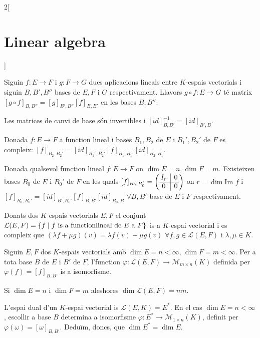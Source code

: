 \documentclass[../../../main.tex]{subfiles}
\begin{document}
\begin{multicols}{2}[\section{Linear algebra}]
\begin{prop}
Siguin $f:E\rightarrow F$ i $g:F\rightarrow G$ dues aplicacions lineals entre $K$-espais vectorials i siguin $B,B',B''$ bases de $E,F$ i $G$ respectivament. Llavors $g\circ f:E\rightarrow G$ té matrix $[g\circ f]_{B,B''}=[g]_{B',B''}[f]_{B,B'}$ en les bases $B, B''$.
\end{prop}
\begin{corollary}
Les matrices de canvi de base són invertibles i $[id]_{B,B'}^{-1}=[id]_{B',B}$.
\end{corollary}
\begin{prop}
Donada $f:E\rightarrow F$ a function lineal i bases $B_1,B_2$ de $E$ i $B_1',B_2'$ de $F$ es compleix: $[f]_{B_2,B_2'}=[id]_{B_1',B_2'}[f]_{B_1,B_1'}[id]_{B_2,B_1}$.
\end{prop}
\begin{theorem}
Donada qualsevol function lineal $f:E\rightarrow F$ on $\dim E=n, \dim F=m$. Existeixen bases $B_0$ de $E$ i $B_0'$ de $F$ en les quals $[f]_{B_0,B_0'}=\left(\begin{array}{@{\,} c|c @{\,}}
    I_r & 0\\
    \hline
    0 & 0
    \end{array}\right)$ on $r=\dim\text{Im }f$ i $[f]_{B_0,B_0'}=[id]_{B',B_0'}[f]_{B,B'}[id]_{B_0,B}$ $\forall B,B'$ base de $E$ i $F$ respectivament.
\end{theorem}
\begin{lemma}
Donats dos $K$ espais vectorials $E,F$ el conjunt $\mathcal{L}(E,F)=\{f\mid f\text{ is a function}\\ \text{lineal de $E$ a $F$}\}$ is a $K$-espai vectorial i es compleix que $(\lambda f+\mu g)(v)=\lambda f(v)+\mu g(v)$ $\forall f,g\in\mathcal{L}(E,F)$ i $\lambda,\mu\in K$.
\end{lemma}
\begin{prop}
Siguin $E,F$ dos $K$-espais vectorials amb $\dim E=n<\infty$, $\dim F=m<\infty$. Per a tota base $B$ de $E$ i $B'$ de $F$, l'function $\varphi:\mathcal{L}(E,F)\rightarrow\mathcal{M}_{m\times n}(K)$ definida per $\varphi(f)=[f]_{B,B'}$ is a isomorfisme.
\end{prop}
\begin{corollary}
Si $\dim E=n$ i $\dim F=m$ aleshores $\dim \mathcal{L}(E,F)=mn$.
\end{corollary}
\begin{definition}
L'espai dual d'un $K$-espai vectorial is $\mathcal{L}(E,K)=E^*$. En el cas $\dim E=n<\infty$, escollir a base $B$ determina a isomorfisme $\varphi:E^*\rightarrow\mathcal{M}_{1\times n}(K)$, definit per $\varphi(\omega)=[\omega]_{B,B'}$. Deduïm, doncs, que $\dim E^*=\dim E$.

\end{definition}
\end{multicols}
\end{document}
